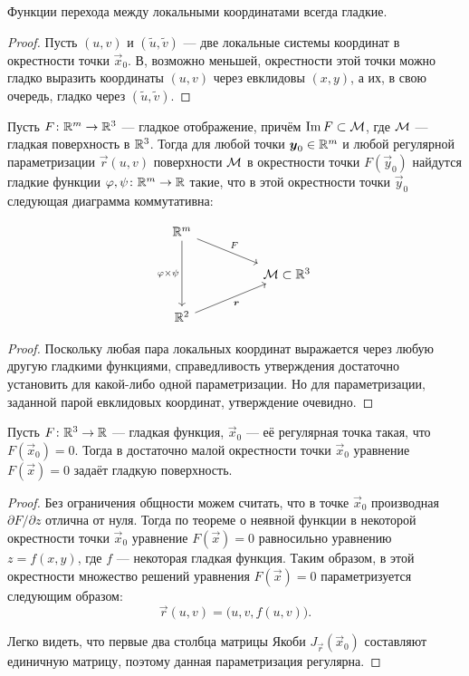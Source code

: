\begin{corollary} \label{corollary:SmoothLocal}
	Функции перехода между локальными координатами всегда гладкие.
\end{corollary}

\begin{proof}
	Пусть $(u, v)$ и $(\widetilde{u}, \widetilde{v})$ --- две локальные системы координат в окрестности точки $\vec{x}_0$. В, возможно меньшей, окрестности этой точки можно гладко выразить координаты $(u, v)$ через евклидовы $(x, y)$, а их, в свою очередь, гладко через $(\widetilde{u}, \widetilde{v})$.
\end{proof}

\begin{corollary}
	Пусть $F\colon \mathbb{R}^m \to \mathbb{R}^3$ --- гладкое отображение, причём $\operatorname{Im} F \subset \mathcal{M}$, где $\mathcal{M}$ --- гладкая поверхность в $\mathbb{R}^3$. Тогда для любой точки $\boldsymbol{y}_0 \in \mathbb{R}^m$ и любой регулярной параметризации $\vec{r}(u, v)$ поверхности $\mathcal{M}$ в окрестности точки $F(\vec{y}_0)$ найдутся гладкие функции $\varphi, \psi\colon \mathbb{R}^m \to \mathbb{R}$ такие, что в этой окрестности точки $\vec{y}_0$ следующая диаграмма коммутативна:

	\[\begin{tikzcd}
		{\R^m} \\
		&& {\mathcal{M} \subset\R^3} \\
		{\R^2}
		\arrow["F", from=1-1, to=2-3]
		\arrow["{\varphi \times \psi}"', from=1-1, to=3-1]
		\arrow["{\boldsymbol{r}}"', from=3-1, to=2-3]
	\end{tikzcd}\]
\end{corollary}

\begin{proof}
	Поскольку любая пара локальных координат выражается через любую другую гладкими функциями, справедливость утверждения достаточно установить для какой-либо одной параметризации. Но для параметризации, заданной парой евклидовых координат, утверждение очевидно.
\end{proof}

\begin{proposition}
	Пусть $F\colon \mathbb{R}^3 \to \mathbb{R}$ --- гладкая функция, $\vec{x}_0$ --- её регулярная точка такая, что $F(\vec{x}_0) = 0$. Тогда в достаточно малой окрестности точки $\vec{x}_0$ уравнение $F(\vec{x}) = 0$ задаёт гладкую поверхность.
\end{proposition}

\begin{proof}
	Без ограничения общности можем считать, что в точке $\vec{x}_0$ производная $\partial F / \partial z$ отлична от нуля. Тогда по теореме о неявной функции в некоторой окрестности точки $\vec{x}_0$ уравнение $F(\vec{x}) = 0$ равносильно уравнению $z = f(x, y)$, где $f$ --- некоторая гладкая функция. Таким образом, в этой окрестности множество решений уравнения $F(\vec{x}) = 0$ параметризуется следующим образом:
	\[
		\vec{r}(u, v) = \big(u, v, f(u, v)\big).
	\]

	Легко видеть, что первые два столбца матрицы Якоби $J_{\vec{r}}(\vec{x}_0)$ составляют единичную матрицу, поэтому данная параметризация регулярна.
\end{proof}

